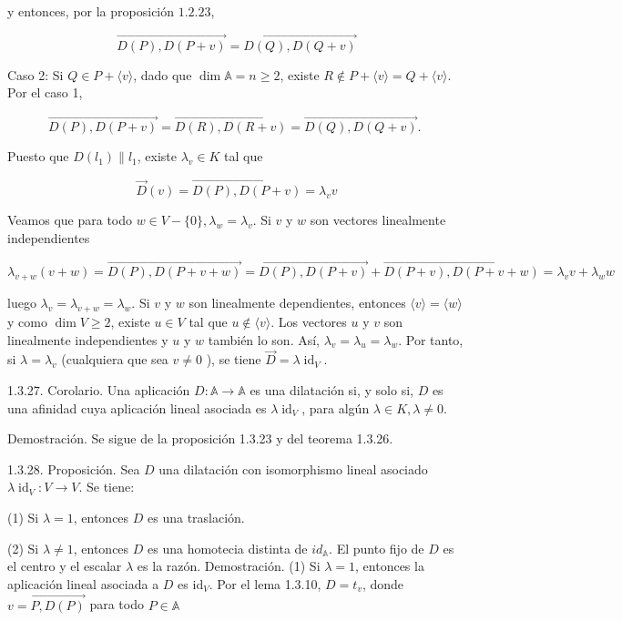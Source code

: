 \documentclass[12pt, a4paper, ones, notitlepage, openany,titlepage]{article}
\begin{document}
y entonces, por la proposición $1.2 .23$,

$$
\overrightarrow{D(P), D(P+v)}=\overrightarrow{D(Q), D(Q+v)}
$$

Caso 2: Si $Q \in P+\langle v\rangle$, dado que $\dim  \mathbb{A}=n \geq 2$, existe $R \notin P+\langle v\rangle=Q+\langle v\rangle$. Por el caso 1,

$$
\overrightarrow{D(P), D(P+v)}=\overrightarrow{D(R), D(R+v)}=\overrightarrow{D(Q), D(Q+v)} \text {. }
$$

Puesto que $D\left(l_{1}\right) \| l_{1}$, existe $\lambda_{v} \in K$ tal que

$$
\vec{D}(v)=\overrightarrow{D(P), D(P+v)}=\lambda_{v} v
$$

Veamos que para todo $w \in V-\{0\}, \lambda_{w}=\lambda_{v}$. Si $v$ y $w$ son vectores linealmente independientes

$$
\lambda_{v+w}(v+w)=\overrightarrow{D(P), D(P+v+w)}=\overrightarrow{D(P), D(P+v)}+\overrightarrow{D(P+v), D(P+v+w)}=\lambda_{v} v+\lambda_{w} w
$$

luego $\lambda_{v}=\lambda_{v+w}=\lambda_{w}$. Si $v$ y $w$ son linealmente dependientes, entonces $\langle v\rangle=\langle w\rangle$ y como $\dim  V \geq 2$, existe $u \in V$ tal que $u \notin\langle v\rangle$. Los vectores $u$ y $v$ son linealmente independientes y $u$ y $w$ también lo son. Así, $\lambda_{v}=\lambda_{u}=\lambda_{w}$. Por tanto, si $\lambda=\lambda_{v}$ (cualquiera que sea $v \neq 0$ ), se tiene $\vec{D}=\lambda \operatorname{id}_{V}$.

1.3.27. Corolario. Una aplicación $D: \mathbb{A} \rightarrow \mathbb{A}$ es una dilatación si, y solo si, $D$ es una afinidad cuya aplicación lineal asociada es $\lambda \operatorname{id}_{V}$, para algún $\lambda \in K, \lambda \neq 0$.

Demostración. Se sigue de la proposición 1.3.23 y del teorema 1.3.26.

1.3.28. Proposición. Sea $D$ una dilatación con isomorphismo lineal asociado $\lambda \operatorname{id}_{V}: V \rightarrow V$. Se tiene:

(1) Si $\lambda=1$, entonces $D$ es una traslación.

(2) Si $\lambda \neq 1$, entonces $D$ es una homotecia distinta de $i d_{\mathbb{A}}$. El punto fijo de $D$ es el centro y el escalar $\lambda$ es la razón. Demostración. (1) Si $\lambda=1$, entonces la aplicación lineal asociada a $D$ es $\mathrm{id}_{V}$. Por el lema 1.3.10, $D=t_{v}$, donde $v=\overrightarrow{P, D(P)}$ para todo $P \in \mathbb{A}$
\end{document}
